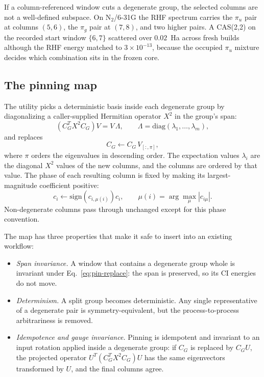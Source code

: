 If a column-referenced window cuts a degenerate group, the selected
columns are not a well-defined subspace.  On N$_2$/6-31G the RHF
spectrum carries the $\pi_u$ pair at columns $(5,6)$, the $\pi_g$ pair
at $(7,8)$, and two higher pairs.  A CAS(2,2) on the recorded start
window $\{6,7\}$ scattered over $0.02$~Ha across fresh builds although
the RHF energy matched to $3\times10^{-13}$, because the occupied
$\pi_u$ mixture decides which combination sits in the frozen core.

\subsection{The pinning map}

The utility picks a deterministic basis inside each degenerate group
by diagonalizing a caller-supplied Hermitian operator $X^{2}$ in the
group's span:
\begin{equation}
  \left(C_G^{T}X^{2}C_G\right)V = V\,\Lambda,
  \qquad
  \Lambda=\mathrm{diag}(\lambda_1,\dots,\lambda_m),
  \label{eq:pin-x2}
\end{equation}
and replaces
\begin{equation}
  C_G \leftarrow C_G\,V_{[:,\pi]},
  \label{eq:pin-replace}
\end{equation}
where $\pi$ orders the eigenvalues in descending order.  The
expectation values $\lambda_i$ are the diagonal $X^{2}$ values of the
new columns, and the columns are ordered by that value.  The phase of
each resulting column is fixed by making its largest-magnitude
coefficient positive:
\begin{equation}
  c_i \leftarrow \mathrm{sign}\!\left(c_{i,\mu(i)}\right)c_i,
  \qquad
  \mu(i)=\arg\max_\mu |c_{i\mu}|.
  \label{eq:pin-phase}
\end{equation}
Non-degenerate columns pass through unchanged except for this phase
convention.

The map has three properties that make it safe to insert into an
existing workflow:

\begin{itemize}
\item \emph{Span invariance.}  A window that contains a degenerate group
  whole is invariant under Eq.~\eqref{eq:pin-replace}: the span is
  preserved, so its CI energies do not move.
\item \emph{Determinism.}  A split group becomes deterministic.  Any
  single representative of a degenerate pair is symmetry-equivalent,
  but the process-to-process arbitrariness is removed.
\item \emph{Idempotence and gauge invariance.}  Pinning is idempotent
  and invariant to an input rotation applied inside a degenerate group:
  if $C_G$ is replaced by $C_GU$, the projected operator
  $U^{T}(C_G^{T}X^{2}C_G)U$ has the same eigenvectors transformed by
  $U$, and the final columns agree.
\end{itemize}

